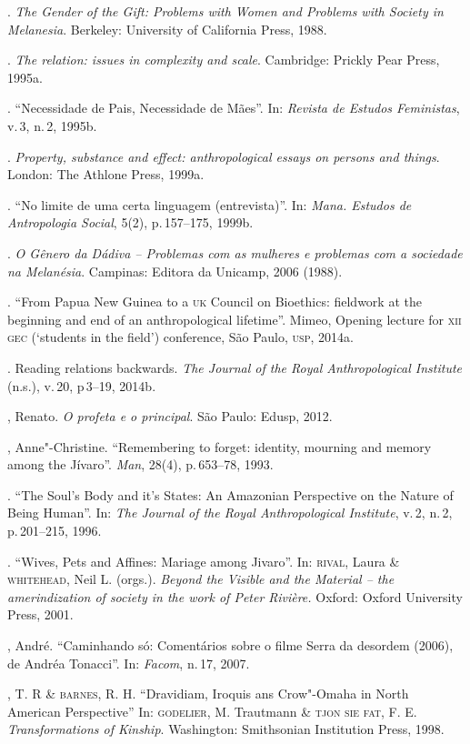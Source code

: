 \begin{bibliohedra}
\titidem. \emph{The Gender of the Gift: Problems with Women and
Problems with Society in Melanesia}. Berkeley: University of California
Press, 1988.

\titidem. \emph{The relation: issues in complexity and scale}.
Cambridge: Prickly Pear Press, 1995a.

\titidem. ``Necessidade de Pais, Necessidade de Mães''. In: \emph{Revista
de Estudos Feministas}, v.\,3, n.\,2, 1995b.

\titidem. \emph{Property, substance and effect: anthropological
essays on persons and things}. London: The Athlone Press, 1999a.

\titidem. ``No limite de uma certa linguagem (entrevista)''. In:
\emph{Mana. Estudos de Antropologia Social}, 5(2), p.\,157--175, 1999b.

\titidem. \emph{O Gênero da Dádiva -- Problemas com as
mulheres e problemas com a sociedade na Melanésia}. Campinas: Editora da
Unicamp, 2006 (1988).

\titidem. ``From Papua New Guinea to a \textsc{uk} Council on Bioethics:
fieldwork at the beginning and end of an anthropological lifetime''.
Mimeo, Opening lecture for \textsc{xii} \textsc{gec} (`students in the field') conference,
São Paulo, \textsc{usp}, 2014a.

\titidem. Reading relations backwards. \emph{The Journal of the
Royal Anthropological Institute} (n.s.), v.\,20, p\,3--19, 2014b.

, Renato. \emph{O profeta e o principal}. São Paulo: Edusp, 2012.

, Anne"-Christine. ``Remembering to forget: identity, mourning and memory
among the Jívaro''. \emph{Man}, 28(4), p.\,653--78, 1993.

\titidem. ``The Soul's Body and it's States: An Amazonian
Perspective on the Nature of Being Human''. In: \emph{The Journal of the Royal Anthropological Institute}, v.\,2, n.\,2, p.\,201--215, 1996.

\titidem. ``Wives, Pets and Affines: Mariage among Jivaro''. In:
\textsc{rival}, Laura \& \textsc{whitehead}, Neil L. (orgs.). \emph{Beyond the Visible and
the Material -- the amerindization of society in the work of Peter
Rivière.} Oxford: Oxford University Press, 2001.

, André. ``Caminhando só: Comentários sobre o filme Serra da
desordem (2006), de Andréa Tonacci''. In: \emph{Facom}, n.\,17, 2007.

, T. R \& \textsc{barnes}, R. H. ``Dravidiam, Iroquis ans Crow"-Omaha in North American Perspective'' In: \textsc{godelier}, M. Trautmann \& \textsc{tjon sie fat}, F. E. \emph{Transformations of Kinship}. Washington: Smithsonian Institution Press, 1998.


\end{bibliohedra}
